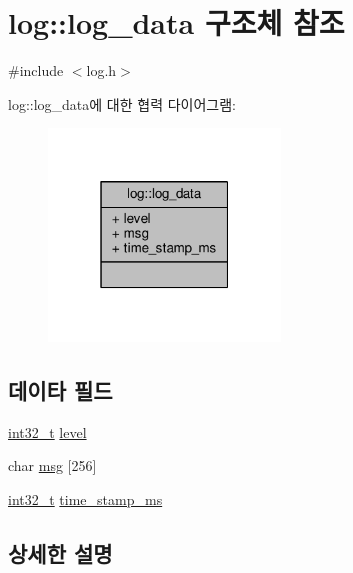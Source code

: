 \hypertarget{structavdecc__lib_1_1log_1_1log__data}{}\section{log\+:\+:log\+\_\+data 구조체 참조}
\label{structavdecc__lib_1_1log_1_1log__data}


{\ttfamily \#include $<$log.\+h$>$}



log\+:\+:log\+\_\+data에 대한 협력 다이어그램\+:
\nopagebreak
\begin{figure}[H]
\begin{center}
\leavevmode
\includegraphics[width=175pt]{structavdecc__lib_1_1log_1_1log__data__coll__graph}
\end{center}
\end{figure}
\subsection*{데이타 필드}
\begin{DoxyCompactItemize}
\item 
\hyperlink{parse_8c_a37994e3b11c72957c6f454c6ec96d43d}{int32\+\_\+t} \hyperlink{structavdecc__lib_1_1log_1_1log__data_a89eb5b8aeacf564f248d836e4ea62f8e}{level}
\item 
char \hyperlink{structavdecc__lib_1_1log_1_1log__data_a9f4ebc879ff493f64c1ed1cee362dee4}{msg} \mbox{[}256\mbox{]}
\item 
\hyperlink{parse_8c_a37994e3b11c72957c6f454c6ec96d43d}{int32\+\_\+t} \hyperlink{structavdecc__lib_1_1log_1_1log__data_af3b0eb8fc59e142e89b53ab76175be29}{time\+\_\+stamp\+\_\+ms}
\end{DoxyCompactItemize}


\subsection{상세한 설명}


